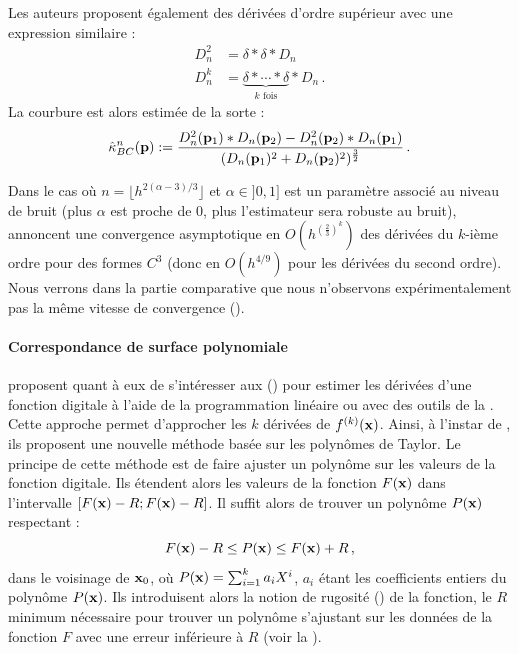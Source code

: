 %
Les auteurs proposent également des dérivées d'ordre supérieur avec une
expression similaire :
%
\begin{align}
  D_n^2 &= \delta \ast \delta \ast D_n \\
  D_n^k &= \underbrace{\delta \ast \cdots \ast \delta}_{k \text{ fois}} \ast D_n \,.
\end{align}
%
La courbure est alors estimée de la sorte :
%
\begin{equation}
  \hat{\kappa}^{n}_{BC}(\mathbf{p}) := \frac{D_n^2(\mathbf{p}_1) \ast D_n(\mathbf{p}_2) - D_n^2(\mathbf{p}_2) \ast D_n(\mathbf{p}_1)}{(D_n(\mathbf{p}_1)^2 + D_n(\mathbf{p}_2)^2)^\frac{3}{2}} \,.
\end{equation}


Dans le cas où $n = \lfloor h^{2(\alpha -3)/3} \rfloor$ et $\alpha \in ]0,1]$ est un paramètre
associé au niveau de bruit (plus $\alpha$ est proche de $0$, plus l'estimateur
sera robuste au bruit),  annoncent une convergence asymptotique en
$O(h^{{(\frac{2}{3})}^k})$ des dérivées du $k$-ième ordre pour des formes $C^3$ (donc en
$O(h^{4/9})$ pour les dérivées du second ordre). Nous verrons dans la partie
comparative que nous n'observons expérimentalement pas la même vitesse de
convergence ().
%
\paragraph{Correspondance de surface polynomiale}
%
 proposent quant à eux de s'intéresser aux
 (\DLL) pour estimer les dérivées d'une fonction
digitale à l'aide de la programmation linéaire ou avec des outils de la
\AlgorithmicGeometry. Cette approche permet d'approcher les $k$ dérivées de
$f^{(k)}(\mathbf{x})$. Ainsi, à l'instar de \JetFitting, ils proposent une nouvelle
méthode basée sur les polynômes de Taylor.
%
Le principe de cette méthode est de faire ajuster un polynôme sur les valeurs de
la fonction digitale. Ils étendent alors les valeurs de la fonction $F(\mathbf{x})$
dans l'intervalle $[F(\mathbf{x}) - R; F(\mathbf{x}) - R]$. Il suffit alors de trouver
un polynôme $P(\mathbf{x})$ respectant :
%
\begin{equation}
    F(\mathbf{x}) - R \le P(\mathbf{x}) \le F(\mathbf{x}) + R \,,
\end{equation}
%
dans le voisinage de $\mathbf{x}_0$, où $P(\mathbf{x}) = \sum_{i=1}^{k} a_iX^i$, $a_i$
étant les coefficients entiers du polynôme $P(\mathbf{x})$. Ils introduisent alors la notion de
rugosité () de la fonction, \cad le $R$ minimum nécessaire
pour trouver un polynôme s'ajustant sur les données de la fonction $F$ avec une
erreur inférieure à $R$ (voir la ).

